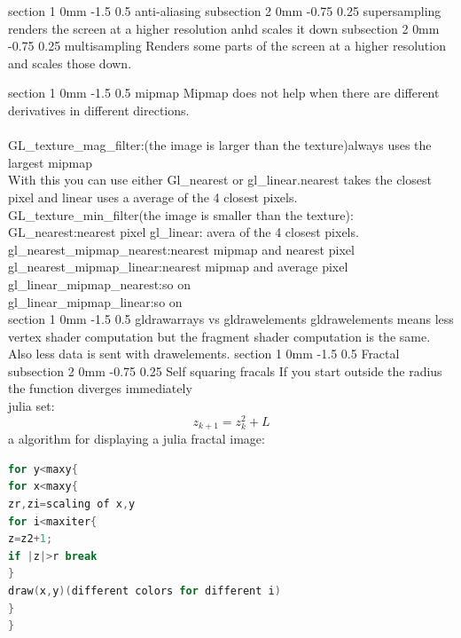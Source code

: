 \documentclass[a4paper,11pt]{article}
\makeatletter
\renewcommand{\section}{\@startsection
   {section}%
   {1}%
   {0mm}%
   {-1.5\baselineskip}%
   {0.5\baselineskip}%
   {\sffamily\bfseries\upshape\normalsize}}%
\renewcommand{\subsection}{\@startsection
   {subsection}%
   {2}%
   {0mm}%
   {-0.75\baselineskip}%
   {0.25\baselineskip}%
   {\rmfamily\normalfont\slshape\normalsize}}%
\makeatother
\begin{document}
\section{anti-aliasing}
\subsection{supersampling}
renders the screen at a higher resolution anhd scales it down
\subsection{multisampling}
Renders some parts of the screen at a higher resolution and scales those down. 

\section{mipmap}
Mipmap does not help when there are different derivatives in different directions.\\
\\
GL\_texture\_mag\_filter:(the image is larger than the texture)always uses the largest mipmap\\
With this you can use either Gl\_nearest or gl\_linear.nearest takes the closest pixel and linear uses a average of the 4 closest pixels.\\
GL\_texture\_min\_filter(the image is smaller than the texture):\\
GL\_nearest:nearest pixel
gl\_linear: avera of the 4 closest pixels.\\
gl\_nearest\_mipmap\_nearest:nearest mipmap and nearest pixel \\
gl\_nearest\_mipmap\_linear:nearest mipmap and average pixel\\
gl\_linear\_mipmap\_nearest:so on\\
gl\_linear\_mipmap\_linear:so on\\
\section{gldrawarrays vs gldrawelements}
gldrawelements means less vertex shader computation but the fragment shader computation is the same. Also less data is sent with drawelements.
\section{Fractal}
\subsection{Self squaring fracals}
If you start outside the radius the function diverges immediately 
\\
julia set:
$$z_{k+1}=z_k^2+L$$
a algorithm for displaying a julia fractal image:
\begin{lstlisting}[language=c]
for y<maxy{
for x<maxy{
zr,zi=scaling of x,y
for i<maxiter{
z=z2+1;
if |z|>r break
}
draw(x,y)(different colors for different i)
}
}
\end{lstlisting}
 
\end{document}
